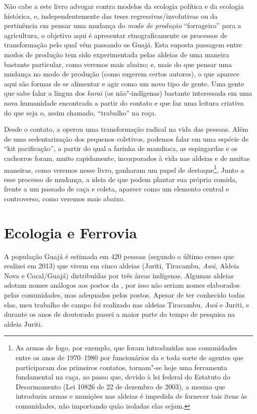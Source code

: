 Não cabe a este livro advogar contra modelos da ecologia política e da
ecologia histórica, e, independentemente das teses
regressivas/involutivas ou da pertinência em pensar uma mudança do
\emph{modo de produção} ``forrageiro'' para a agricultura, o objetivo
aqui é apresentar etnograficamente os processos de transformação pelo
qual vêm passando os Guajá. Esta suposta passagem entre modos de
produção tem sido experimentada pelas aldeias de uma maneira bastante
particular, como veremos mais abaixo; e, mais do que pensar uma mudança
no modo de produção (como sugerem certos autores), o que aparece aqui
são formas de se alimentar e agir como um novo tipo de gente. Uma gente
que sabe falar a língua dos \emph{karai} (os não"-indígenas) bastante
interessada em uma nova humanidade encontrada a partir do contato e que
faz uma leitura criativa do que seja o, assim chamado, ``trabalho'' na
roça.

Desde o contato, a  operou uma transformação radical na vida das
pessoas. Além de uma sedentarização dos pequenos coletivos, podemos
falar em uma espécie de ``kit pacificação'', a partir do qual a farinha
de mandioca, as espingardas e os cachorros foram, muito rapidamente,
incorporados à vida nas aldeias e de muitas maneiras, como veremos nesse
livro, ganharam um papel de destaque\footnote{As armas de fogo, por
  exemplo, que foram introduzidas nas comunidades entre os anos de
  1970--1980 por funcionários da  e toda sorte de agentes que
  participaram dos primeiros contatos, tornam"-se hoje uma ferramenta
  fundamental na caça, ao passo que, devido à lei federal do Estatuto do
  Desarmamento (Lei 10826 de 22 de dezembro de 2003), a mesma  que
  introduziu armas e munições nas aldeias é impedida de fornecer tais
  itens às comunidades, não importando quão isoladas elas sejam.}. Junto
a esse processo de mudança, a ideia de que podem plantar sua própria
comida, frente a um passado de caça e coleta, aparece como um elemento
central e controverso, como veremos mais abaixo.

\section{Ecologia e Ferrovia }

A população Guajá é estimada em 420 pessoas (segundo o último censo que
realizei em 2013) que vivem em cinco aldeias (Juriti, Tiracambu,
\emph{Awá}, Aldeia Nova e Cocal/Guajá) distribuídas por três áreas
indígenas. Algumas aldeias adotam nomes análogos aos postos da ,
por isso não seriam nomes elaborados pelas comunidades, mas adequados
pelos postos. Apesar de ter conhecido todas elas, meu trabalho de campo
foi realizado nas aldeias Tiracambu, \emph{Awá} e Juriti, e durante os
anos de doutorado passei a maior parte do tempo de pesquisa na aldeia
Juriti.

